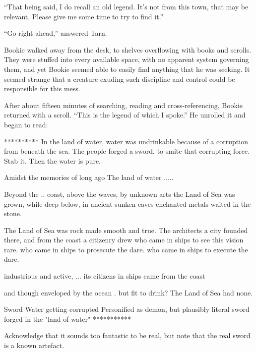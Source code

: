 ``That being said, I do recall an old legend.  It's not from this town, that may be relevant.  Please give me some time to try to find it.''

``Go right ahead,'' answered Tarn.

Bookie walked away from the desk, to shelves overflowing with books and scrolls.  They were stuffed into every available space, with no apparent system governing them, and yet Bookie seemed able to easily find anything that he was seeking.  It seemed strange that a creature exuding such discipline and control could be responsible for this mess.

After about fifteen minutes of searching, reading and cross-referencing, Bookie returned with a scroll.  ``This is the legend of which I spoke.''  He unrolled it and began to read:

**********
In the land of water, water was undrinkable because of a corruption from beneath the sea.
The people forged a sword, to smite that corrupting force.  Stab it.
Then the water is pure.

Amidst the memories of long ago
The land of water .....


Beyond the .. coast, above the waves,
by unknown arts the Land of Sea was grown,
while deep below, in ancient sunken caves
enchanted metals waited in the stone.

The Land of Sea was rock made smooth and true.
The architects a city founded there,
and from the coast a citizenry drew
who came in ships to see this vision rare.
who came in ships to prosecute the dare.
who came in ships to execute the dare.

industrious and active, ...
its citizens in ships came from the coast 


and though enveloped by the ocean .
but fit to drink?  The Land of Sea had none.



Sword
Water getting corrupted
Personified as demon, but plausibly literal
sword forged in the "land of water"
***********

Acknowledge that it sounds too fantastic to be real, but note that the real sword is a known artefact.